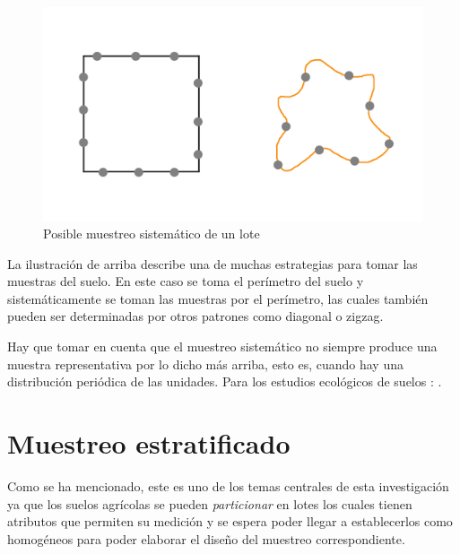 \documentclass{report}
\begin{document}
\bigbreak

\begin{figure}[H]
    \centering
    \includegraphics[width=0.3\paperwidth]{img/soil-systematic-sampling.png}
    \caption{Posible muestreo sistemático de un lote}
\end{figure}

La ilustración de arriba describe una de muchas estrategias \cite{lassaga-2011} \cite{gobpe-ministerio-del-ambiente-2014} para tomar las muestras del suelo. En este caso se toma el perímetro del suelo y sistemáticamente se toman las muestras por el perímetro, las cuales también pueden ser determinadas por otros patrones como diagonal o zigzag.

\bigbreak

Hay que tomar en cuenta que el muestreo sistemático no siempre produce una muestra representativa por lo dicho más arriba, esto es, cuando hay una distribución periódica de las unidades. Para los estudios ecológicos de suelos \cite{lohr-2009}: .

\section{Muestreo estratificado}

Como se ha mencionado, este es uno de los temas centrales de esta investigación ya que los suelos agrícolas se pueden \textit{particionar} en lotes los cuales tienen atributos que permiten su medición y se espera poder llegar a establecerlos como homogéneos para poder elaborar el diseño del muestreo correspondiente.

\bigbreak
\end{document}
